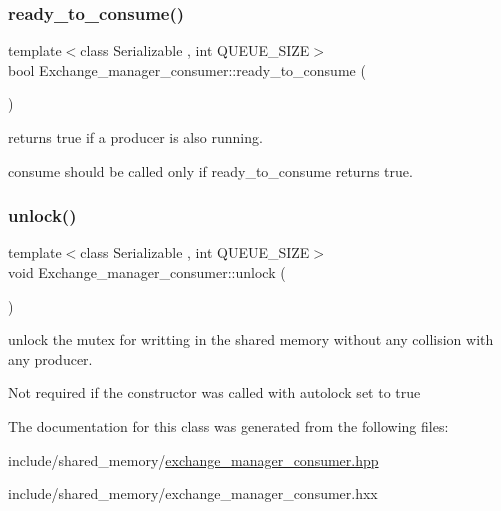 \subsubsection{\texorpdfstring{ready\+\_\+to\+\_\+consume()}{ready\_to\_consume()}}
{\footnotesize\ttfamily template$<$class Serializable , int Q\+U\+E\+U\+E\+\_\+\+S\+I\+ZE$>$ \\
bool Exchange\+\_\+manager\+\_\+consumer\+::ready\+\_\+to\+\_\+consume (\begin{DoxyParamCaption}{ }\end{DoxyParamCaption})}



returns true if a producer is also running. 

\textquotesingle{}consume\textquotesingle{} should be called only if ready\+\_\+to\+\_\+consume returns true. \mbox{\label{classshared__memory_1_1Exchange__manager__consumer_aaf053702ec1ef8455fc10e70144f6923}} 
\subsubsection{\texorpdfstring{unlock()}{unlock()}}
{\footnotesize\ttfamily template$<$class Serializable , int Q\+U\+E\+U\+E\+\_\+\+S\+I\+ZE$>$ \\
void Exchange\+\_\+manager\+\_\+consumer\+::unlock (\begin{DoxyParamCaption}{ }\end{DoxyParamCaption})}



unlock the mutex for writting in the shared memory without any collision with any producer. 

Not required if the constructor was called with autolock set to true 

The documentation for this class was generated from the following files\+:\begin{DoxyCompactItemize}
\item 
include/shared\+\_\+memory/\hyperlink{exchange__manager__consumer_8hpp}{exchange\+\_\+manager\+\_\+consumer.\+hpp}\item 
include/shared\+\_\+memory/exchange\+\_\+manager\+\_\+consumer.\+hxx\end{DoxyCompactItemize}
